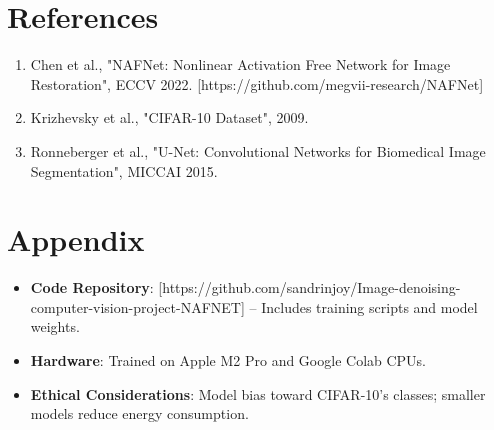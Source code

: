 \documentclass[final]{article}
\begin{document}
\section{References}
\begin{enumerate}
    \item Chen et al., "NAFNet: Nonlinear Activation Free Network for Image Restoration", ECCV 2022. [https://github.com/megvii-research/NAFNet]
    \item Krizhevsky et al., "CIFAR-10 Dataset", 2009.
    \item Ronneberger et al., "U-Net: Convolutional Networks for Biomedical Image Segmentation", MICCAI 2015.
\end{enumerate}

\section{Appendix}
\begin{itemize}
    \item \textbf{Code Repository}: [https://github.com/sandrinjoy/Image-denoising-computer-vision-project-NAFNET] – Includes training scripts and model weights.
    \item \textbf{Hardware}: Trained on Apple M2 Pro and Google Colab CPUs.
    \item \textbf{Ethical Considerations}: Model bias toward CIFAR-10’s classes; smaller models reduce energy consumption.
\end{itemize}

{\small


}
\end{document}
